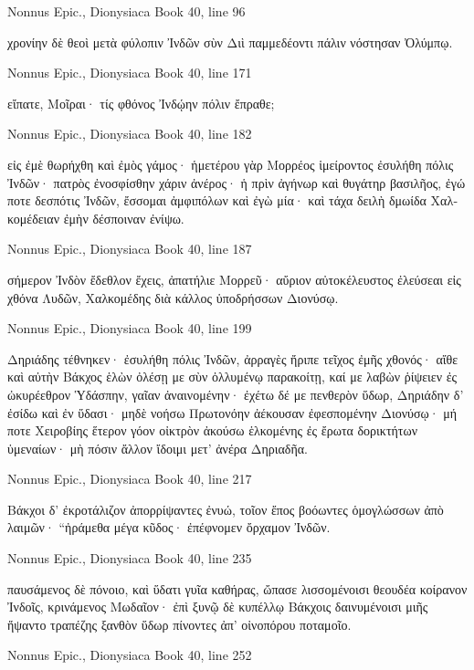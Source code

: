 \documentclass[12pt,letterpaper,twoside,final]{memoir}
\begin{document}
\begin{greek}
Nonnus Epic., Dionysiaca 
Book 40, line 96

             χρονίην δὲ θεοὶ μετὰ φύλοπιν Ἰνδῶν 
σὺν Διὶ παμμεδέοντι πάλιν νόστησαν Ὀλύμπῳ. 



Nonnus Epic., Dionysiaca 
Book 40, line 171

                                       εἴπατε, Μοῖραι· 
τίς φθόνος Ἰνδῴην πόλιν ἔπραθε; 



Nonnus Epic., Dionysiaca 
Book 40, line 182

εἰς ἐμὲ θωρήχθη καὶ ἐμὸς γάμος· ἡμετέρου γὰρ 
Μορρέος ἱμείροντος ἐσυλήθη πόλις Ἰνδῶν· 
πατρὸς ἐνοσφίσθην χάριν ἀνέρος· ἡ πρὶν ἀγήνωρ 
καὶ θυγάτηρ βασιλῆος, ἐγώ ποτε δεσπότις Ἰνδῶν, 
ἔσσομαι ἀμφιπόλων καὶ ἐγὼ μία· καὶ τάχα δειλὴ 
δμωίδα Χαλκομέδειαν ἐμὴν δέσποιναν ἐνίψω. 



Nonnus Epic., Dionysiaca 
Book 40, line 187

σήμερον Ἰνδὸν ἔδεθλον ἔχεις, ἀπατήλιε Μορρεῦ· 
αὔριον αὐτοκέλευστος ἐλεύσεαι εἰς χθόνα Λυδῶν, 
Χαλκομέδης διὰ κάλλος ὑποδρήσσων Διονύσῳ. 



Nonnus Epic., Dionysiaca 
Book 40, line 199

Δηριάδης τέθνηκεν· ἐσυλήθη πόλις Ἰνδῶν, 
ἀρραγὲς ἤριπε τεῖχος ἐμῆς χθονός· αἴθε καὶ αὐτὴν 
Βάκχος ἑλὼν ὀλέσῃ με σὺν ὀλλυμένῳ παρακοίτῃ, 
καί με λαβὼν ῥίψειεν ἐς ὠκυρέεθρον Ὑδάσπην, 
γαῖαν ἀναινομένην· ἐχέτω δέ με πενθερὸν ὕδωρ, 
Δηριάδην δ' ἐσίδω καὶ ἐν ὕδασι· μηδὲ νοήσω 
Πρωτονόην ἀέκουσαν ἐφεσπομένην Διονύσῳ· 
μή ποτε Χειροβίης ἕτερον γόον οἰκτρὸν ἀκούσω 
ἑλκομένης ἐς ἔρωτα δορικτήτων ὑμεναίων· 
μὴ πόσιν ἄλλον ἴδοιμι μετ' ἀνέρα Δηριαδῆα. 



Nonnus Epic., Dionysiaca 
Book 40, line 217

Βάκχοι δ' ἐκροτάλιζον ἀπορρίψαντες ἐνυώ, 
τοῖον ἔπος βοόωντες ὁμογλώσσων ἀπὸ λαιμῶν· 
 “ἠράμεθα μέγα κῦδος· ἐπέφνομεν ὄρχαμον Ἰνδῶν. 



Nonnus Epic., Dionysiaca 
Book 40, line 235

παυσάμενος δὲ πόνοιο, καὶ ὕδατι γυῖα καθήρας, 
ὤπασε λισσομένοισι θεουδέα κοίρανον Ἰνδοῖς, 
κρινάμενος Μωδαῖον· ἐπὶ ξυνῷ δὲ κυπέλλῳ 
Βάκχοις δαινυμένοισι μιῆς ἥψαντο τραπέζης 
ξανθὸν ὕδωρ πίνοντες ἀπ' οἰνοπόρου ποταμοῖο. 



Nonnus Epic., Dionysiaca 
Book 40, line 252


\end{greek}
\end{document}
